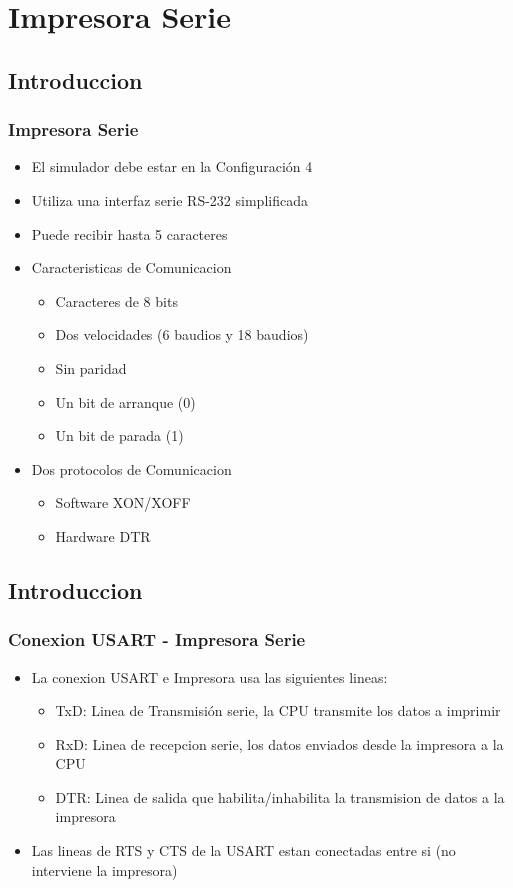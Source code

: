 \documentclass{beamer}
\begin{document}
\section{Impresora Serie}
\subsection{Introduccion}
\begin{frame}[fragile]
\frametitle{Impresora Serie}
\begin{itemize}
 \item El simulador debe estar en la Configuración 4
 \item Utiliza una interfaz serie RS-232 simplificada
 \item Puede recibir hasta 5 caracteres
 \item Caracteristicas de Comunicacion
 \begin{itemize}
  \item Caracteres de 8 bits
  \item Dos velocidades (6 baudios y 18 baudios)
  \item Sin paridad
  \item Un bit de arranque (0)
  \item Un bit de parada (1)
 \end{itemize}
  \item Dos protocolos de Comunicacion
\begin{itemize}
 \item Software XON/XOFF
 \item Hardware DTR
\end{itemize}

\end{itemize}
\end{frame}


\subsection{Introduccion}
\begin{frame}[fragile]
\frametitle{Conexion USART - Impresora Serie}
\begin{itemize}
 \item La conexion USART e Impresora usa las siguientes lineas:
 \begin{itemize}
  \item TxD: Linea de Transmisión serie, la CPU transmite los datos a imprimir
  \item RxD: Linea de recepcion serie, los datos enviados desde la impresora a la CPU
  \item DTR: Linea de salida que habilita/inhabilita la transmision de datos a la impresora
\end{itemize}
\item Las lineas de RTS y CTS de la USART estan conectadas entre si (no interviene la impresora)
\end{itemize}
\end{frame}
\end{document}
